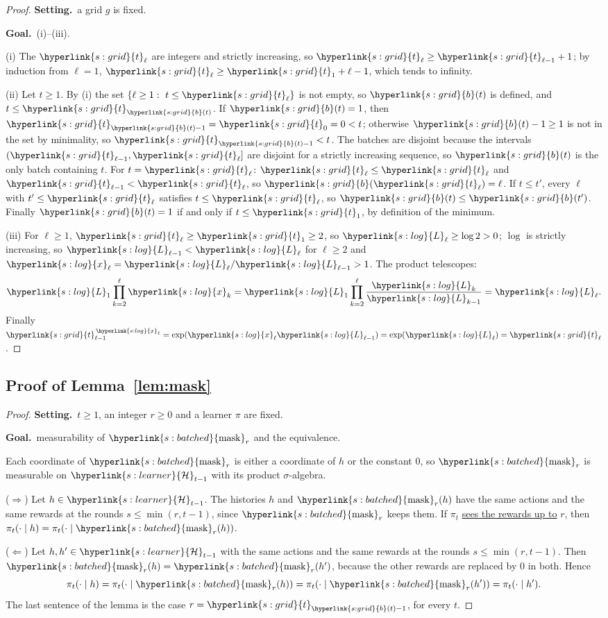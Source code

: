 \documentclass[11pt]{article}
\newcommand{\sy}[2]{{\hyperlink{#1}{#2}}}
\newcommand{\term}[2]{\hyperlink{#1}{#2}}
\newcommand{\1}{\mathbf{1}}
\newcommand{\Hs}{\sy{s:learner}{\mathcal H}}
\newcommand{\tl}{\sy{s:grid}{t}}
\newcommand{\bt}{\sy{s:grid}{b}}
\newcommand{\Lg}{\sy{s:log}{L}}
\newcommand{\xg}{\sy{s:log}{x}}
\newcommand{\mask}{\sy{s:batched}{\mathrm{mask}}}
\newcommand{\sees}{\term{t:sees}{sees the rewards up to}}
\newcommand{\Setting}{\noindent\textbf{Setting.}\ }
\newcommand{\Goal}{\par\smallskip\noindent\textbf{Goal.}\ }
\begin{document}
\begin{proof}
\Setting a grid $g$ is fixed. \Goal (i)--(iii).

(i) The $\tl_\ell$ are integers and strictly increasing, so $\tl_\ell\ge\tl_{\ell-1}+1$; by induction
from $\ell=1$, $\tl_\ell\ge\tl_1+\ell-1$, which tends to infinity.

(ii) Let $t\ge1$. By (i) the set $\{\ell\ge1:\ t\le\tl_\ell\}$ is not empty, so $\bt(t)$ is defined,
and $t\le\tl_{\bt(t)}$. If $\bt(t)=1$, then $\tl_{\bt(t)-1}=\tl_0=0<t$; otherwise
$\bt(t)-1\ge1$ is not in the set by minimality, so $\tl_{\bt(t)-1}<t$. The batches are disjoint
because the intervals $(\tl_{\ell-1},\tl_\ell]$ are disjoint for a strictly increasing sequence, so
$\bt(t)$ is the only batch containing $t$. For $t=\tl_\ell$: $\tl_\ell\le\tl_\ell$ and
$\tl_{\ell-1}<\tl_\ell$, so $\bt(\tl_\ell)=\ell$. If $t\le t'$, every $\ell$ with $t'\le\tl_\ell$
satisfies $t\le\tl_\ell$, so $\bt(t)\le\bt(t')$. Finally $\bt(t)=1$ if and only if $t\le\tl_1$, by
definition of the minimum.

(iii) For $\ell\ge1$, $\tl_\ell\ge\tl_1\ge2$, so $\Lg_\ell\ge\log2>0$; $\log$ is strictly increasing,
so $\Lg_{\ell-1}<\Lg_\ell$ for $\ell\ge2$ and $\xg_\ell=\Lg_\ell/\Lg_{\ell-1}>1$. The product
telescopes:
\begin{equation*}
  \Lg_1\prod_{k=2}^{\ell}\xg_k=\Lg_1\prod_{k=2}^{\ell}\frac{\Lg_k}{\Lg_{k-1}}=\Lg_\ell .
\end{equation*}
Finally $\tl_{\ell-1}^{\,\xg_\ell}=\exp(\xg_\ell\Lg_{\ell-1})=\exp(\Lg_\ell)=\tl_\ell$.
\end{proof}

\subsection{Proof of Lemma~\ref{lem:mask}}\label{sec:pf-lem:mask}

\begin{proof}
\Setting $t\ge1$, an integer $r\ge0$ and a learner $\pi$ are fixed. \Goal measurability of
$\mask_r$ and the equivalence.

Each coordinate of $\mask_r$ is either a coordinate of $h$ or the constant $0$, so $\mask_r$ is
measurable on $\Hs_{t-1}$ with its product $\sigma$-algebra.

($\Rightarrow$) Let $h\in\Hs_{t-1}$. The histories $h$ and $\mask_r(h)$ have the same actions and the
same rewards at the rounds $s\le\min(r,t-1)$, since $\mask_r$ keeps them. If $\pi_t$ \sees{} $r$, then
$\pi_t(\cdot\mid h)=\pi_t(\cdot\mid\mask_r(h))$.

($\Leftarrow$) Let $h,h'\in\Hs_{t-1}$ with the same actions and the same rewards at the rounds
$s\le\min(r,t-1)$. Then $\mask_r(h)=\mask_r(h')$, because the other rewards are replaced by $0$ in
both. Hence
\begin{equation*}
  \pi_t(\cdot\mid h)=\pi_t(\cdot\mid\mask_r(h))=\pi_t(\cdot\mid\mask_r(h'))=\pi_t(\cdot\mid h').
\end{equation*}
The last sentence of the lemma is the case $r=\tl_{\bt(t)-1}$, for every $t$.
\end{proof}
\end{document}
